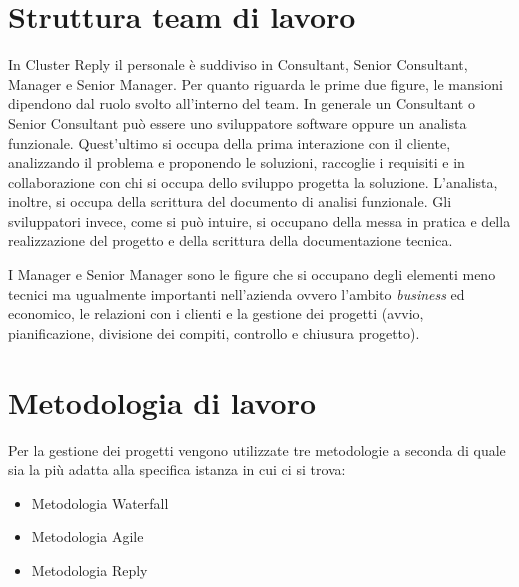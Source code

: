 \section{Struttura team di lavoro}
In Cluster Reply il personale è suddiviso in Consultant, Senior Consultant, Manager e Senior Manager. Per quanto riguarda le prime due figure, le mansioni dipendono dal ruolo svolto all'interno del team. In generale un Consultant o Senior Consultant può essere uno sviluppatore software oppure un analista funzionale. Quest'ultimo si occupa della prima interazione con il cliente, analizzando il problema e proponendo le soluzioni, raccoglie i requisiti e in collaborazione con chi si occupa dello sviluppo progetta la soluzione. L'analista, inoltre, si occupa della scrittura del documento di analisi funzionale. Gli sviluppatori invece, come si può intuire, si occupano della messa in pratica e della realizzazione del progetto e della scrittura della documentazione tecnica.

I Manager e Senior Manager sono le figure che si occupano degli elementi meno tecnici ma ugualmente importanti nell'azienda ovvero l'ambito \textit{business} ed economico, le relazioni con i clienti e la gestione dei progetti (avvio, pianificazione, divisione dei compiti, controllo e chiusura progetto). 

\section{Metodologia di lavoro}
Per la gestione dei progetti vengono utilizzate tre metodologie a seconda di quale sia la più adatta alla specifica istanza in cui ci si trova:
\begin{itemize}
  \item Metodologia Waterfall
  \item Metodologia Agile
  \item Metodologia Reply
\end{itemize}

